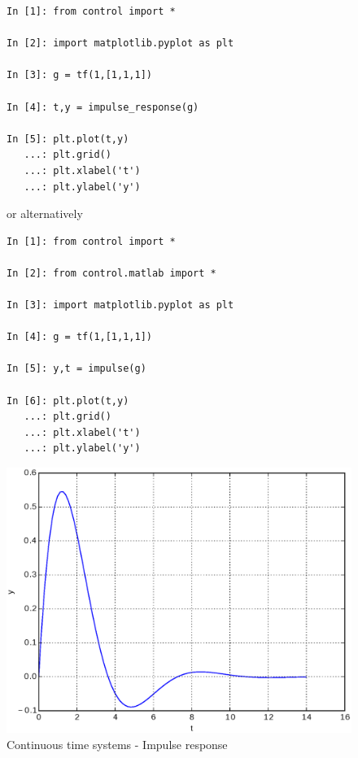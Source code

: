 \begin{figure}[htbp]	%
\begin{minipage}[t]{0.55\textwidth}
  \vspace{0pt}
\begin{lstlisting}[linewidth=7cm,xleftmargin=0cm]
In [1]: from control import *

In [2]: import matplotlib.pyplot as plt

In [3]: g = tf(1,[1,1,1])

In [4]: t,y = impulse_response(g)

In [5]: plt.plot(t,y)
   ...: plt.grid()
   ...: plt.xlabel('t')
   ...: plt.ylabel('y')
\end{lstlisting}

or alternatively

\begin{lstlisting}[linewidth=7cm,xleftmargin=0cm]
In [1]: from control import *

In [2]: from control.matlab import *

In [3]: import matplotlib.pyplot as plt

In [4]: g = tf(1,[1,1,1])

In [5]: y,t = impulse(g)

In [6]: plt.plot(t,y)
   ...: plt.grid()
   ...: plt.xlabel('t')
   ...: plt.ylabel('y')
\end{lstlisting}
\end{minipage}%
\begin{minipage}[t]{0.5\textwidth}
  \vspace{0pt} \centering
  \includegraphics[width=\textwidth]{eps/impulse.eps}
\end{minipage}
\caption{Continuous time systems - Impulse response}
\label{F4}
\end{figure}

